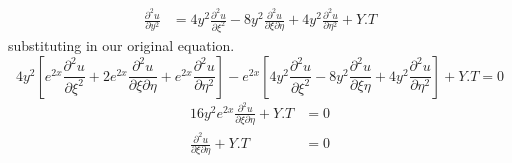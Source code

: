 \documentclass[]{article}
\begin{document}
\begin{example}
\begin{align*}
        \\
        \frac{\partial^2 u}{\partial y^2} &= 4y^2\frac{\partial^2 u}{\partial\xi^2}-8y^2\frac{\partial^2 u}{\partial\xi\partial\eta}+4y^2\frac{\partial^2 u}{\partial\eta^2}+Y.T
    \end{align*}
    substituting in our original equation.
    \[
        4y^2\left[e^{2x}\frac{\partial^2 u}{\partial\xi^2}+2e^{2x}\frac{\partial^2 u}{\partial\xi\partial\eta}+e^{2x}\frac{\partial^2 u}{\partial\eta^2}\right]-e^{2x}\left[4y^2\frac{\partial^2 u}{\partial\xi^2}-8y^2\frac{\partial^2 u}{\partial\xi\eta}+4y^2\frac{\partial^2 u}{\partial\eta^2}\right]+Y.T = 0    
    \]
    \begin{align*}
        16y^2 e^{2x}\frac{\partial^2 u}{\partial\xi\partial\eta}+Y.T &= 0
        \\
        \frac{\partial^2 u}{\partial\xi\partial\eta} +Y.T &= 0
    \end{align*}
\end{example}
\end{document}
